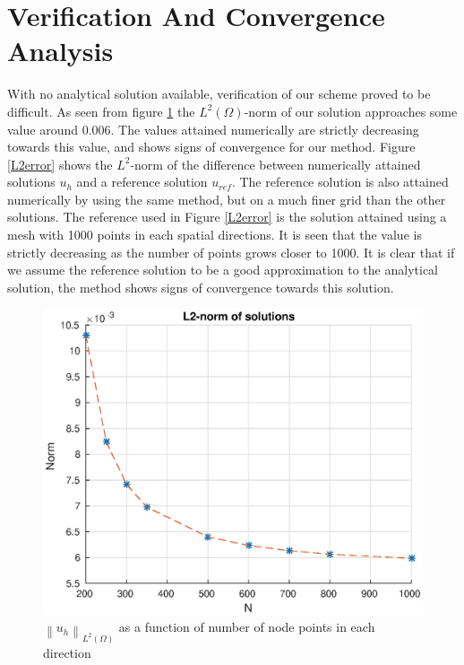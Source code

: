 \documentclass[10pt,a4paper]{article}
\newcommand{\vectornorm}[1]{\left\|#1\right\|}
\begin{document}
\section*{Verification And Convergence Analysis}
With no analytical solution available, verification of our scheme proved to be difficult. As seen from figure \ref{L2sol} the $L^2(\Omega)$-norm of our solution approaches some value around 0.006. The values attained numerically are strictly decreasing towards this value, and shows signs of convergence for our method. Figure \ref{L2error} shows the $L^2$-norm of the difference between numerically attained solutions $u_h$ and a reference solution $u_{ref}$. The reference solution is also attained numerically by using the same method, but on a much finer grid than the other solutions. The reference used in Figure \ref{L2error} is the solution attained using a mesh with 1000 points in each spatial directions. It is seen that the value is strictly decreasing as the number of points grows closer to 1000. It is clear that if we assume the reference solution to be a good approximation to the analytical solution, the method shows signs of convergence towards this solution.

\begin{figure}
    \centering
    \includegraphics[scale=0.8]{figures/L2solutions}
    \caption{$\vectornorm{u_h}_{L^2(\Omega)}$ as a function of number of node points in each direction}
    \label{L2sol}
\end{figure} 
\end{document}
